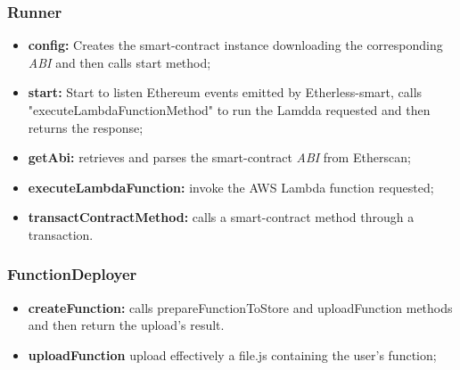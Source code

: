 \subsubsection{Runner}
\begin{itemize}
	\item \textbf{config:} Creates the smart-contract instance downloading the corresponding \textit{ABI\glo} and then calls start method;
	\item \textbf{start:} Start to listen Ethereum events emitted by Etherless-smart, calls "executeLambdaFunctionMethod" to run the Lamdda requested and then returns the response;
	\item \textbf{getAbi:} retrieves and parses the smart-contract \textit{ABI\glo} from Etherscan;
	\item \textbf{executeLambdaFunction:} invoke the AWS Lambda function requested;
	\item \textbf{transactContractMethod:} calls a smart-contract method through a transaction.
\end{itemize}
\subsubsection{FunctionDeployer}
\begin{itemize}
	\item \textbf{createFunction:} calls prepareFunctionToStore and uploadFunction methods and then return the upload's result.
	\item \textbf{uploadFunction} upload effectively a file.js containing the user's function;
	
\end{itemize}
